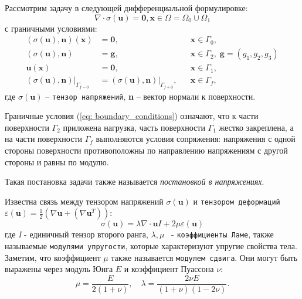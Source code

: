 \documentclass[a4paper, 14pt]{extreport}
\begin{document}
Рассмотрим задачу в следующей дифференциальной формулировке:
\begin{equation}
	\label{eq:1}
	\nabla\!\cdot\!\sigma(\textbf{u}) = \textbf{0}, \textbf{x} \in \Omega = \Omega_0 \cup \Omega_1
\end{equation}
с граничными условиями:
\begin{equation}
	\label{eq: boundary_conditions}
	\begin{aligned}
		(\sigma(\textbf{u}), \textbf{n})(\textbf{x}) 	  	  &= \textbf{0},   &&\textbf{x} \in \Gamma_0,\\
		(\sigma(\textbf{u}), \textbf{n}) 				  	  &= \textbf{g},   &&\textbf{x} \in \Gamma_2, \; \textbf{g} = (g_1, g_2, g_3)\\
		\textbf{u}(\textbf{x})							  	  &= \textbf{0},	   &&\textbf{x} \in \Gamma_1,\\
		(\sigma(\textbf{u}), \textbf{n})\vert_{\Gamma_{f - 0}} &= 
			(\sigma(\textbf{u}), \textbf{n})\vert_{\Gamma_{f + 0}},             &&\textbf{x} \in \Gamma_f,
	\end{aligned}
\end{equation}
где $\sigma(\textbf{u})$  -- \texttt{тензор напряжений}, \textbf{n} -- вектор нормали
к поверхности. 

Граничные условия (\ref{eq: boundary_conditions}) означают, что к части поверхности 
$\Gamma_2$ приложена нагрузка, часть поверхности $\Gamma_1$ жестко закреплена, 
а на части поверхности $\Gamma_f$ выполняются условия сопряжения: напряжения 
с одной стороны поверхности противоположны по направлению напряжениям с 
другой стороны и равны по модулю.

Такая постановка задачи также называется \textit{постановкой в напряжениях}.

Известна связь между тензором напряжений $\sigma(\textbf{u})$ и \texttt{тензором деформаций}
$\varepsilon(\textbf{u}) = \frac{1}{2}(\nabla\textbf{u} + (\nabla\textbf{u}^T))$:
\begin{equation*}
\sigma(\textbf{u}) = \lambda \nabla\!\cdot\!\textbf{u}\textit{I} + 2\mu\varepsilon(\textbf{u})
\end{equation*}
где \textit{I} - единичный тензор второго ранга,
$\lambda, \mu $ \, - \texttt{коэффициенты Ламе}, также называемые 
\texttt{модулями упругости}, которые характеризуют упругие свойства тела. Заметим, что коэффициент $\mu$ также называется \texttt{модулем сдвига}. Они могут быть выраже­ны через модуль Юнга $E$ и коэффициент Пуассона $\nu$:
\begin{equation}
\mu = \frac{E}{2(1 + \nu)}, \quad \lambda = \frac{2\nu E}{(1 + \nu)(1 - 2\nu)}.
\end{equation}
\end{document}
